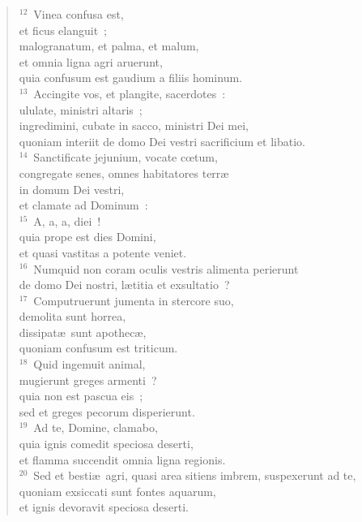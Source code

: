\begin{verse}
${}^{12}$~Vinea confusa est,\\ et ficus elanguit~;\\ malogranatum, et palma, et malum,\\ et omnia ligna agri aruerunt,\\ quia confusum est gaudium a filiis hominum.\\
${}^{13}$~Accingite vos, et plangite, sacerdotes~:\\ ululate, ministri altaris~;\\ ingredimini, cubate in sacco, ministri Dei mei,\\ quoniam interiit de domo Dei vestri sacrificium et libatio.\\
${}^{14}$~Sanctificate jejunium, vocate cœtum,\\ congregate senes, omnes habitatores terr\ae \\ in domum Dei vestri,\\ et clamate ad Dominum~:\\
${}^{15}$~A, a, a, diei~!\\ quia prope est dies Domini,\\ et quasi vastitas a potente veniet.\\
${}^{16}$~Numquid non coram oculis vestris alimenta perierunt\\ de domo Dei nostri, l\ae titia et exsultatio~?\\
${}^{17}$~Computruerunt jumenta in stercore suo,\\ demolita sunt horrea,\\ dissipat\ae\ sunt apothec\ae ,\\ quoniam confusum est triticum.\\
${}^{18}$~Quid ingemuit animal,\\ mugierunt greges armenti~?\\ quia non est pascua eis~;\\ sed et greges pecorum disperierunt.\\
${}^{19}$~Ad te, Domine, clamabo,\\ quia ignis comedit speciosa deserti,\\ et flamma succendit omnia ligna regionis.\\
${}^{20}$~Sed et besti\ae\ agri, quasi area sitiens imbrem, suspexerunt ad te,\\ quoniam exsiccati sunt fontes aquarum,\\ et ignis devoravit speciosa deserti.\end{verse}


